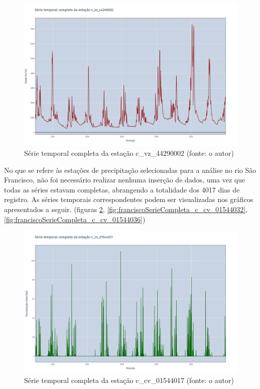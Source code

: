 \begin{figure}[!h]
\centering
\includegraphics[scale=0.25]{Figuras/rio_sao_francisco/franciscoSerieCompleta_c_vz_44290002.png}
\caption{Série temporal completa da estação c\_vz\_44290002 (fonte: o autor)}
\label{fig:franciscoSerieCompleta_c_vz_44290002}
\end{figure}

No que se refere às estações de precipitação selecionadas para a análise no rio São Francisco, não foi necessário realizar nenhuma inserção de dados, uma vez que todas as séries estavam completas, abrangendo a totalidade dos 4017 dias de registro. As séries temporais correspondentes podem ser visualizadas nos gráficos apresentados a seguir. (figuras \ref{fig:franciscoSerieCompleta_c_cv_01544017}, \ref{fig:franciscoSerieCompleta_c_cv_01544032}, \ref{fig:franciscoSerieCompleta_c_cv_01544036})

\begin{figure}[!h]
\centering
\includegraphics[scale=0.25]{Figuras/rio_sao_francisco/franciscoSerieCompleta_c_cv_01544017.png}
\caption{Série temporal completa da estação c\_cv\_01544017 (fonte: o autor)}
\label{fig:franciscoSerieCompleta_c_cv_01544017}
\end{figure}


